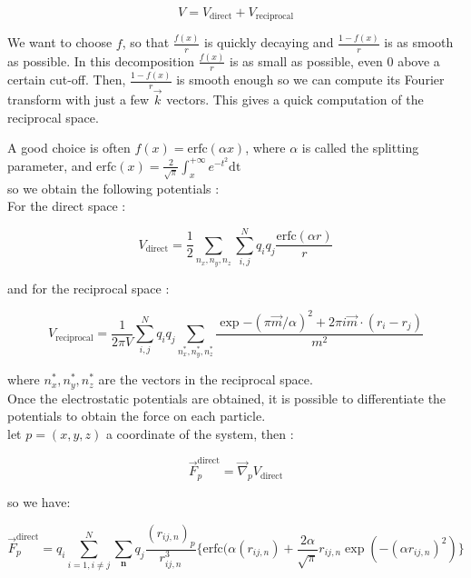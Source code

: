 \documentclass[11pt,twoside,a4paper]{report}
\begin{document}
\begin{equation}
    V = V_{\text{direct}} + V_{\text{reciprocal}}
\end{equation}

We want to choose $f$, so that $\frac{f(x)}{r}$ is quickly decaying and $\frac{1 - f(x)}{r}$ is as smooth as possible. In this decomposition $\frac{f(x)}{r}$  is as small as possible, even $0$ above a certain cut-off. Then, $\frac{1-f(x)}{r}$ is smooth enough so we can compute its Fourier transform with just a few $\overrightarrow{k}$ vectors. This gives a quick computation of the reciprocal space.

A good choice is often $f(x) = \text{erfc}(\alpha x)$, where $\alpha$ is called the splitting parameter, and $\text{erfc}(x) = \frac{2}{\sqrt{\pi}} \int_{x}^{+\infty}{e^{-t^2}\text{dt}} $\\

so we obtain the following potentials :\\

For the direct space :

\begin{equation}
   V_{\text{direct}} =  \frac{1}{2} \sum_{n_x,n_y,n_z} \sum_{i,j}^{N} q_i q_j \frac{\text{erfc}(\alpha r)}{r}
\end{equation}

and for the reciprocal space :

\begin{equation}
\label{Vrecip}
	V_{\text{reciprocal}} = \frac{1}{2 \pi V} \sum_{i,j}^{N} q_i q_j \sum_{n_x^*,n_y^*,n_z^*}\frac{\exp{-(\pi \overrightarrow{m}/\alpha)^2} +2\pi i \overrightarrow{m} \cdot (r_i - r_j)}{m^2}
\end{equation}

where $n_x^*,n_y^*,n_z^*$ are the vectors in the reciprocal space.\\


Once the electrostatic potentials are obtained, it is possible to differentiate the potentials to obtain the force on each particle.\\

let $p = (x,y,z)$ a coordinate of the system, then :


\begin{equation}
   \overrightarrow{F}_p^{\text{direct}} = \overrightarrow{\nabla}_p V_{\text{direct}} 
\end{equation}


so we have:

\begin{equation}
\label{ewaldDirect}
   \overrightarrow{F}_p^{\text{direct}} = q_i \sum\limits_{i=1,i\neq j}^N \sum\limits_{\textbf{n}} q_j \frac{(r_{ij,n})_p}{r_{ij,n}^3}
   \{\text{erfc}(\alpha (r_{ij,n}) + \frac{2\alpha}{\sqrt{\pi}} r_{ij,n} \exp(-(\alpha r_{ij,n})^2)\}
\end{equation}
\end{document}

